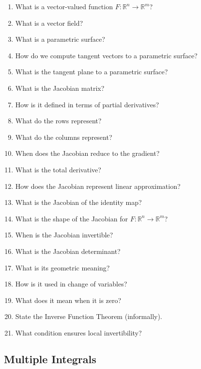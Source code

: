 \begin{enumerate}[resume]
  \item What is a vector-valued function \(F:\mathbb{R}^{n} \to \mathbb{R}^{m}\)?
  \item What is a vector field?
  \item What is a parametric surface?
  \item How do we compute tangent vectors to a parametric surface?
  \item What is the tangent plane to a parametric surface?
  \item What is the Jacobian matrix?
  \item How is it defined in terms of partial derivatives?
  \item What do the rows represent?
  \item What do the columns represent?
  \item When does the Jacobian reduce to the gradient?
  \item What is the total derivative?
  \item How does the Jacobian represent linear approximation?
  \item What is the Jacobian of the identity map?
  \item What is the shape of the Jacobian for \(F:\mathbb{R}^{n} \to \mathbb{R}^{m}\)?
  \item When is the Jacobian invertible?
  \item What is the Jacobian determinant?
  \item What is its geometric meaning?
  \item How is it used in change of variables?
  \item What does it mean when it is zero?
  \item State the Inverse Function Theorem (informally).
  \item What condition ensures local invertibility?
\end{enumerate}

\subsection{Multiple Integrals}

